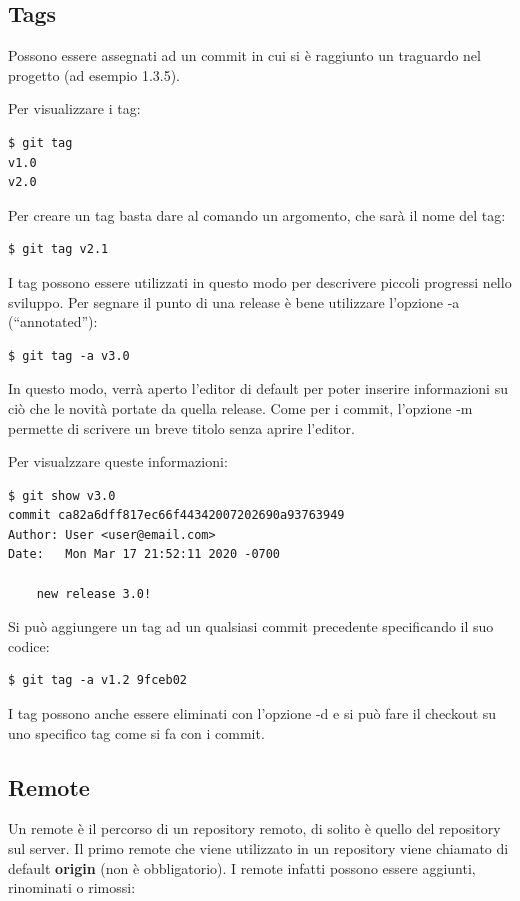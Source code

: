 \documentclass{article}
\begin{document}
\subsection{Tags}
Possono essere assegnati ad un commit in cui si è raggiunto un traguardo nel
progetto (ad esempio 1.3.5).

Per visualizzare i tag:

\begin{verbatim}
$ git tag
v1.0
v2.0
\end{verbatim}

Per creare un tag basta dare al comando un argomento, che sarà il nome del tag:

\begin{verbatim}
$ git tag v2.1
\end{verbatim}

I tag possono essere utilizzati in questo modo per descrivere piccoli progressi
nello sviluppo. Per segnare il punto di una release è bene utilizzare l'opzione
-a (``annotated''): 

\begin{verbatim}
$ git tag -a v3.0
\end{verbatim}

In questo modo, verrà aperto l'editor di default per poter inserire informazioni
su ciò che le novità portate da quella release. Come per i commit, l'opzione -m
permette di scrivere un breve titolo senza aprire l'editor.

Per visualzzare queste informazioni:

\begin{verbatim}
$ git show v3.0
commit ca82a6dff817ec66f44342007202690a93763949
Author: User <user@email.com>
Date:   Mon Mar 17 21:52:11 2020 -0700

    new release 3.0!
\end{verbatim}

Si può aggiungere un tag ad un qualsiasi commit precedente specificando il suo
codice:

\begin{verbatim}
$ git tag -a v1.2 9fceb02
\end{verbatim}

I tag possono anche essere eliminati con l'opzione -d e si può fare il checkout
su uno specifico tag come si fa con i commit.

\subsection{Remote\label{remoti}}
Un remote è il percorso di un repository remoto, di solito è quello del
repository sul server. Il primo remote che viene utilizzato in un repository
viene chiamato di default \textbf{origin} (non è obbligatorio). I remote infatti
possono essere aggiunti, rinominati o rimossi:
\end{document}
